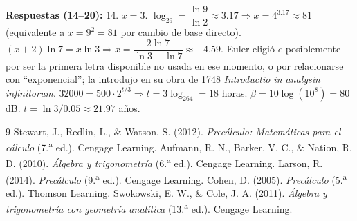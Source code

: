 \documentclass[12pt,letterpaper]{book}
\begin{document}
\textbf{Respuestas (14--20):} 14. $x=3$. $\log_29=\dfrac{\ln9}{\ln2}\approx3.17\Rightarrow x=4^{3.17}\approx81$ (equivalente a $x=9^2=81$ por cambio de base directo). $(x+2)\ln7=x\ln3\Rightarrow x=\dfrac{2\ln7}{\ln3-\ln7}\approx-4.59$. Euler eligió $e$ posiblemente por ser la primera letra disponible no usada en ese momento, o por relacionarse con ``exponencial''; la introdujo en su obra de 1748 \emph{Introductio in analysin infinitorum}. $32000=500\cdot2^{t/3}\Rightarrow t=3\log_264=18$ horas. $\beta=10\log(10^{8})=80$ dB. $t=\ln3/0.05\approx21.97$ años.

\begin{thebibliography}{9}
 Stewart, J., Redlin, L., \& Watson, S. (2012). \textit{Precálculo: Matemáticas para el cálculo} (7.\textsuperscript{a} ed.). Cengage Learning.
 Aufmann, R. N., Barker, V. C., \& Nation, R. D. (2010). \textit{Álgebra y trigonometría} (6.\textsuperscript{a} ed.). Cengage Learning.
 Larson, R. (2014). \textit{Precálculo} (9.\textsuperscript{a} ed.). Cengage Learning.
 Cohen, D. (2005). \textit{Precálculo} (5.\textsuperscript{a} ed.). Thomson Learning.
 Swokowski, E. W., \& Cole, J. A. (2011). \textit{Álgebra y trigonometría con geometría analítica} (13.\textsuperscript{a} ed.). Cengage Learning.
\end{thebibliography}
\end{document}
